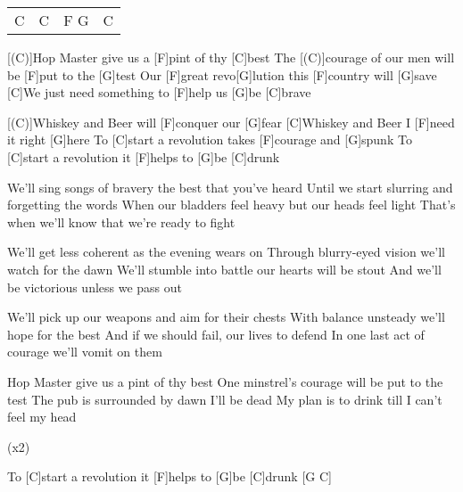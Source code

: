 

\begin{guitar}
	{\footnotesize\begin{tabular}{l|l|l|l}
			C & C & F G & C
	\end{tabular}}

	[(C)]Hop Master give us a [F]pint of thy [C]best
	The [(C)]courage of our men will be [F]put to the [G]test
	Our [F]great revo[G]lution this [F]country will [G]save
	[C]We just need something to [F]help us [G]be [C]brave
	
	[(C)]Whiskey and Beer will [F]conquer our [G]fear
	[C]Whiskey and Beer I [F]need it right [G]here
	To [C]start a revolution takes [F]courage and [G]spunk
	To [C]start a revolution it [F]helps to [G]be [C]drunk
	
	We'll sing songs of bravery the best that you've heard
	Until we start slurring and forgetting the words
	When our bladders feel heavy but our heads feel light
	That's when we'll know that we're ready to fight
	
	 
	
	We'll get less coherent as the evening wears on
	Through blurry-eyed vision we'll watch for the dawn
	We'll stumble into battle our hearts will be stout
	And we'll be victorious unless we pass out
	
	 
	
	We'll pick up our weapons and aim for their chests
	With balance unsteady we'll hope for the best
	And if we should fail, our lives to defend
	In one last act of courage we'll vomit on them
	
	 
	
	Hop Master give us a pint of thy best
	One minstrel's courage will be put to the test
	The pub is surrounded by dawn I'll be dead
	My plan is to drink till I can't feel my head
	
	  (x2)
	
	To [C]start a revolution it [F]helps to [G]be [C]drunk [G C]{}
\end{guitar}